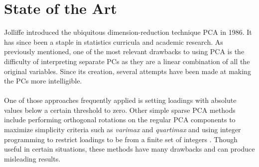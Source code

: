 \documentclass[11pt,letterpaper]{report}
\begin{document}
\section*{State of the Art}
Jolliffe \citeyear{Jolliffe1986} introduced the ubiquitous dimension-reduction technique PCA in 1986. It has since been a staple in statistics curricula and academic research. As previously mentioned, one of the most relevant drawbacks to using PCA is the difficulty of interpreting separate PCs as they are a linear combination of all the original variables. Since its creation, several attempts have been made at making the PCs more intelligible.\\
\\
One of those approaches frequently applied is setting loadings with absolute values below a certain threshold to zero. Other simple sparse PCA methods include performing orthogonal rotations on the regular PCA components to maximize simplicity criteria such as \textit{varimax} and \textit{quartimax} \cite{Richman1986, Richman1987} and using integer programming to restrict loadings to be from a finite set of integers \cite{Hausman1982, Vines2000}. Though useful in certain situations, these methods have many drawbacks and can produce misleading results.\\

\end{document}

